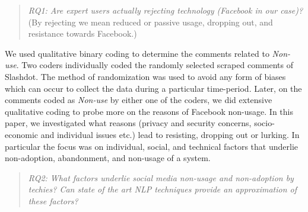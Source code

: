 \begin{quote}
    \textit{RQ1: Are expert users actually rejecting technology (Facebook in our case)?} (By rejecting we mean reduced or passive usage, dropping out, and resistance towards Facebook.)

\end{quote}

 We used qualitative binary coding to determine the comments related to \emph{Non-use}. Two coders individually coded the randomly selected scraped comments of Slashdot. The method of randomization was used to avoid any form of biases which can occur to collect the data during a particular time-period. Later, on the comments coded as \emph{Non-use} by either one of the coders, we did extensive qualitative coding  to probe more on the reasons of Facebook non-usage. In this paper, we investigated what reasons (privacy and security concerns, socio-economic and individual issues etc.) lead to resisting, dropping out or lurking. In particular the focus was on individual, social, and technical factors that underlie non-adoption, abandonment, and non-usage of a system. 
 
 \begin{quote}
    \textit{RQ2: What factors underlie social media non-usage and non-adoption by techies? Can state of the art NLP techniques provide an approximation of these factors?}

\end{quote}

